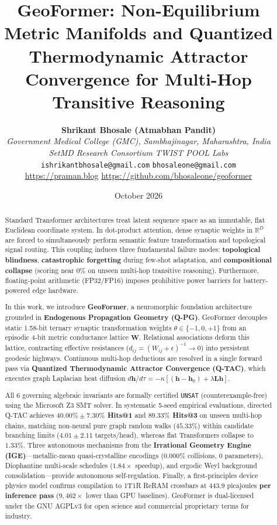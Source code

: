 \documentclass[11pt,a4paper]{article}
\title{\textbf{\LARGE GeoFormer: Non-Equilibrium Metric Manifolds and Quantized Thermodynamic Attractor Convergence for Multi-Hop Transitive Reasoning}}
\author{
    \textbf{Shrikant Bhosale (Atmabhan Pandit)}\\[0.3em]
    \textit{Government Medical College (GMC), Sambhajinagar, Maharashtra, India}\\
    \textit{SetMD Research Consortium \quad TWIST POOL Labs}\\[0.2em]
    \texttt{ishrikantbhosale@gmail.com} \quad \texttt{bhosaleone@gmail.com}\\[0.1em]
    \url{https://praman.blog} \quad \url{https://github.com/bhosaleone/geoformer}
}
\date{October 2026}
\begin{document}
\maketitle

\begin{abstract}
Standard Transformer architectures treat latent sequence space as an immutable, flat Euclidean coordinate system. In dot-product attention, dense synaptic weights in $\mathbb{R}^D$ are forced to simultaneously perform semantic feature transformation and topological signal routing. This coupling induces three fundamental failure modes: \textbf{topological blindness}, \textbf{catastrophic forgetting} during few-shot adaptation, and \textbf{compositional collapse} (scoring near $0\%$ on unseen multi-hop transitive reasoning). Furthermore, floating-point arithmetic (FP32/FP16) imposes prohibitive power barriers for battery-powered edge hardware.

In this work, we introduce \textbf{GeoFormer}, a neuromorphic foundation architecture grounded in \textbf{Endogenous Propagation Geometry (Q-PG)}. GeoFormer decouples static 1.58-bit ternary synaptic transformation weights $\theta \in \{-1, 0, +1\}$ from an episodic 4-bit metric conductance lattice $\mathbf{W}$. Relational associations deform this lattice, contracting effective resistances ($d_{ij} = (W_{ij} + \epsilon)^{-1} \to 0$) into persistent geodesic highways. Continuous multi-hop deductions are resolved in a single forward pass via \textbf{Quantized Thermodynamic Attractor Convergence (Q-TAC)}, which executes graph Laplacian heat diffusion $d\mathbf{h}/d\tau = -\kappa [(\mathbf{h} - \mathbf{h}_0) + \lambda \mathbf{L} \mathbf{h}]$.

All 6 governing algebraic invariants are formally certified \texttt{UNSAT} (counterexample-free) using the Microsoft Z3 SMT solver. In systematic 5-seed empirical evaluations, directed Q-TAC achieves \textbf{$40.00\% \pm 7.30\%$ Hits@1} and \textbf{$89.33\%$ Hits@3} on unseen multi-hop chains, matching non-neural pure graph random walks ($45.33\%$) within candidate branching limits ($4.01 \pm 2.11$ targets/head), whereas flat Transformers collapse to $1.33\%$. Three autonomous mechanisms from the \textbf{Irrational Geometry Engine (IGE)}---metallic-mean quasi-crystalline encodings ($0.000\%$ collisions, 0 parameters), Diophantine multi-scale schedules ($1.84\times$ speedup), and ergodic Weyl background consolidation---provide autonomous self-regulation. Finally, a first-principles device physics model confirms compilation to 1T1R ReRAM crossbars at \textbf{$443.9\text{ picajoules}$ per inference pass} ($9,462\times$ lower than GPU baselines). GeoFormer is dual-licensed under the GNU AGPLv3 for open science and commercial proprietary terms for industry.
\end{abstract}
\end{document}
